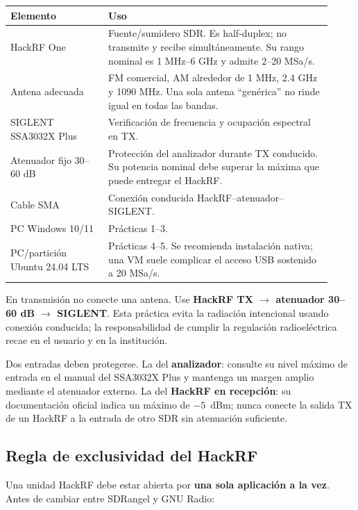 \begin{longtable}{@{}p{0.28\linewidth}p{0.64\linewidth}@{}}
\toprule
\textbf{Elemento} & \textbf{Uso} \\
\midrule
\endhead
HackRF One & Fuente/sumidero SDR. Es half-duplex; no transmite y recibe simultáneamente. Su rango nominal es 1 MHz--6 GHz y admite 2--20 MSa/s. \\
Antena adecuada & FM comercial, AM alrededor de 1 MHz, 2.4 GHz y 1090 MHz. Una sola antena ``genérica'' no rinde igual en todas las bandas. \\
SIGLENT SSA3032X Plus & Verificación de frecuencia y ocupación espectral en TX. \\
Atenuador fijo 30--60 dB & Protección del analizador durante TX conducido. Su potencia nominal debe superar la máxima que puede entregar el HackRF. \\
Cable SMA & Conexión conducida HackRF--atenuador--SIGLENT. \\
PC Windows 10/11 & Prácticas 1--3. \\
PC/partición Ubuntu 24.04 LTS & Prácticas 4--5. Se recomienda instalación nativa; una VM suele complicar el acceso USB sostenido a 20 MSa/s. \\
\bottomrule
\end{longtable}

\begin{alerta}
En transmisión no conecte una antena. Use \textbf{HackRF TX $\rightarrow$ atenuador 30--60 dB $\rightarrow$ SIGLENT}. Esta práctica evita la radiación intencional usando conexión conducida; la responsabilidad de cumplir la regulación radioeléctrica recae en el usuario y en la institución.

Dos entradas deben protegerse. La del \textbf{analizador}: consulte su nivel máximo de entrada en el manual del SSA3032X Plus y mantenga un margen amplio mediante el atenuador externo. La del \textbf{HackRF en recepción}: su documentación oficial indica un máximo de $-5$~dBm; nunca conecte la salida TX de un HackRF a la entrada de otro SDR sin atenuación suficiente.
\end{alerta}

\subsection{Regla de exclusividad del HackRF}

Una unidad HackRF debe estar abierta por \textbf{una sola aplicación a la vez}. Antes de cambiar entre SDRangel y GNU Radio:

